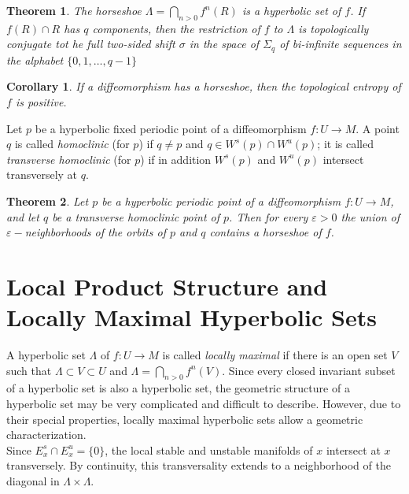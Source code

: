 \documentclass{article}
\newtheorem{thm}{Theorem}
\newtheorem{cor}{Corollary}
\begin{document}
\begin{thm}

The horseshoe $\Lambda=\bigcap_{n > 0}f^n(R)$ is a hyperbolic set of $f$. If $f(R)\cap R$ has $q$ components, then the restriction of $f$ to $\Lambda$ is topologically conjugate tot he full two-sided shift $\sigma$ in the space of $\Sigma_q$ of bi-infinite sequences in the alphabet $\{ 0,1,\ldots, q-1\}$

\end{thm}

\begin{cor}

If a diffeomorphism has a horseshoe, then the topological entropy of $f$ is positive.

\end{cor}

\indent Let $p$ be a hyperbolic fixed periodic point of a diffeomorphism $f:U \to M$. A point $q$ is called \textit{homoclinic} (for $p$) if $q \neq p$ and $q \in W^s(p) \cap W^u(p)$; it is called \textit{transverse homoclinic} (for $p$) if in addition $W^s(p)$ and $W^u(p)$ intersect transversely at $q$.

\begin{thm}

Let $p$ be a hyperbolic periodic point of a diffeomorphism $f:U \to M$, and let $q$ be a transverse homoclinic point of $p$. Then for every $\varepsilon >0 $ the union of $\varepsilon-$neighborhoods of the orbits of $p$ and $q$ contains a horseshoe of $f$.

\end{thm}

\section{Local Product Structure and Locally Maximal Hyperbolic Sets}

A hyperbolic set $\Lambda$ of $f: U \to M$ is called \textit{locally maximal} if there is an open set $V$ such that $\Lambda \subset V \subset U$ and $\Lambda=\bigcap_{n>0} f^n(V)$. Since every closed invariant subset of a hyperbolic set is also a hyperbolic set, the geometric structure of a hyperbolic set may be very complicated and difficult to describe. However, due to their special properties, locally maximal hyperbolic sets allow a geometric characterization. \\
\indent Since $E^s_x \cap E^u_x = \{0\}$, the local stable and unstable manifolds of $x$ intersect at $x$ transversely. By continuity, this transversality extends to a neighborhood of the diagonal in $\Lambda \times \Lambda$.
\end{document}
